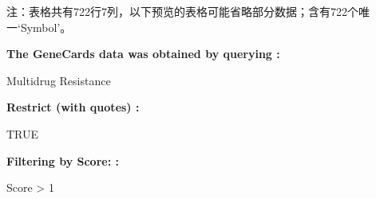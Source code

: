 \documentclass[
]{article}
\begin{document}
\begin{center}\begin{tcolorbox}[colback=gray!10, colframe=gray!50, width=0.9\linewidth, arc=1mm, boxrule=0.5pt]注：表格共有722行7列，以下预览的表格可能省略部分数据；含有722个唯一`Symbol'。
\end{tcolorbox}
\end{center}\begin{center}\begin{tcolorbox}[colback=gray!10, colframe=gray!50, width=0.9\linewidth, arc=1mm, boxrule=0.5pt]
\textbf{
The GeneCards data was obtained by querying
:}

\vspace{0.5em}

    Multidrug Resistance

\vspace{2em}


\textbf{
Restrict (with quotes)
:}

\vspace{0.5em}

    TRUE

\vspace{2em}


\textbf{
Filtering by Score:
:}

\vspace{0.5em}

    Score > 1

\vspace{2em}
\end{tcolorbox}
\end{center}
\end{document}
